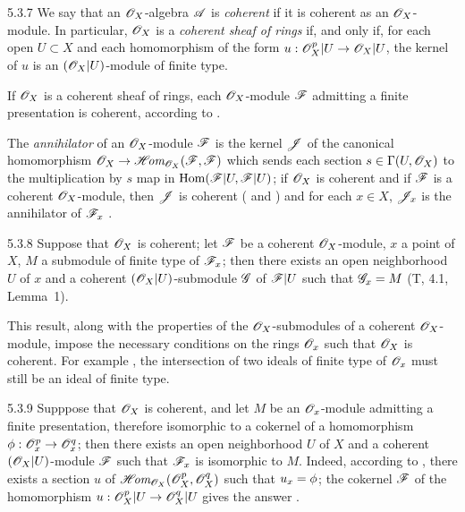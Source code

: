 \begin{env}{5.3.7}
\label{env-0.5.3.7}
We say that an $\mathscr{O}_X$-algebra $\mathscr{A}$ is \emph{coherent} if it is coherent as an
$\mathscr{O}_X$-module. In particular, $\mathscr{O}_X$ is a \emph{coherent sheaf of rings} if, and only if,
for each open $U\subset X$ and each homomorphism of the form $u:\mathscr{O}_X^p|U\to\mathscr{O}_X|U$, the
kernel of $u$ is an $(\mathscr{O}_X|U)$-module of finite type.

If $\mathscr{O}_X$ is a coherent sheaf of rings, each $\mathscr{O}_X$-module $\mathscr{F}$ admitting a finite
presentation  is coherent, according to .

The \emph{annihilator} of an $\mathscr{O}_X$-module $\mathscr{F}$ is the kernel $\mathscr{J}$ of the canonical
homomorphism $\mathscr{O}_X\to\mathscr{H}\!\textit{om}_{\mathscr{O}_X}(\mathscr{F},\mathscr{F})$ which sends each section
$s\in\Gamma(U,\mathscr{O}_X)$ to the multiplication by $s$ map in ${\mathop{\mathrm{Hom}}\nolimits}(\mathscr{F}|U,\mathscr{F}|U)$; if
$\mathscr{O}_X$ is coherent and if $\mathscr{F}$ is a coherent $\mathscr{O}_X$-module, then $\mathscr{J}$ is coherent
( and ) and for each $x\in X$, $\mathscr{J}_x$ is the
annihilator of $\mathscr{F}_x$ .
\end{env}

\begin{env}{5.3.8}
\label{env-0.5.3.8}
Suppose that $\mathscr{O}_X$ is coherent; let $\mathscr{F}$ be a coherent $\mathscr{O}_X$-module, $x$ a point of
$X$, $M$ a submodule of finite type of $\mathscr{F}_x$; then there exists an open neighborhood $U$
of $x$ and a coherent $(\mathscr{O}_X|U)$-submodule $\mathscr{G}$ of $\mathscr{F}|U$ such that $\mathscr{G}_x=M$
(T, 4.1, Lemma~1).

This result, along with the properties of the $\mathscr{O}_X$-submodules of a coherent
$\mathscr{O}_X$-module, impose the necessary conditions on the rings $\mathscr{O}_x$ such that $\mathscr{O}_X$ is
coherent. For example , the intersection of two ideals of finite type of
$\mathscr{O}_x$ must still be an ideal of finite type.
\end{env}

\begin{env}{5.3.9}
\label{env-0.5.3.9}
Supppose that $\mathscr{O}_X$ is coherent, and let $M$ be an $\mathscr{O}_x$-module admitting a finite
presentation, therefore isomorphic to a cokernel of a homomorphism $\phi:\mathscr{O}_x^p\to\mathscr{O}_x^q$;
then there exists an open neighborhood $U$ of $X$ and a coherent $(\mathscr{O}_X|U)$-module $\mathscr{F}$
such that $\mathscr{F}_x$ is isomorphic to $M$. Indeed, according to , there
exists a section $u$ of $\mathscr{H}\!\textit{om}_{\mathscr{O}_X}(\mathscr{O}_X^p,\mathscr{O}_X^q)$ such that $u_x=\phi$; the cokernel
$\mathscr{F}$ of the homomorphism $u:\mathscr{O}_X^p|U\to\mathscr{O}_X^q|U$ gives the answer .
\end{env}

